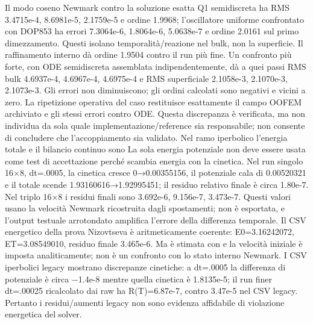 {}Il modo coseno Newmark contro la soluzione esatta Q1 semidiscreta ha RMS 3.4715e-4, 8.6981e-5, 2.1759e-5 e ordine 1.9968; l’oscillatore uniforme confrontato con DOP853 ha errori 7.3064e-6, 1.8064e-6, 5.0638e-7 e ordine 2.0161 sul primo dimezzamento. Questi isolano temporalità/reazione nel bulk, non la superficie.\markdownRendererInterblockSeparator
{} Il raffinamento interno  dà ordine 1.9504 contro il run più fine. Un confronto più forte, con ODE semidiscreta assemblata indipendentemente, dà a quei passi RMS bulk 4.6937e-4, 4.6967e-4, 4.6975e-4 e RMS superficiale 2.1058e-3, 2.1070e-3, 2.1073e-3. Gli errori non diminuiscono; gli ordini calcolati sono negativi e vicini a zero. La ripetizione operativa del caso restituisce esattamente il campo OOFEM archiviato e gli stessi errori contro ODE. Questa discrepanza è verificata, ma non individua da sola quale implementazione/reference sia responsabile; non consente di concludere che l’accoppiamento sia validato.\markdownRendererInterblockSeparator
{}
\markdownRendererSectionEnd \markdownRendererSectionBegin
{}\markdownRendererInterblockSeparator
{}Nel ramo iperbolico l’energia totale e il bilancio continuo sono\markdownRendererInterblockSeparator
{}\markdownRendererInterblockSeparator
{}La sola energia potenziale non deve essere usata come test di accettazione perché scambia energia con la cinetica. Nel run singolo 16×8, dt=.0005, la cinetica cresce 0→0.00355156, il potenziale cala di 0.00520321 e il totale scende 1.93160616→1.92995451; il residuo relativo finale è circa 1.80e-7. Nel triplo 16×8 i residui finali sono 3.692e-6, 9.156e-7, 3.473e-7. Questi valori usano la velocità Newmark ricostruita dagli spostamenti;  non è esportata, e l’output testuale arrotondato amplifica l’errore della differenza temporale.\markdownRendererInterblockSeparator
{}Il CSV energetico della prova Nizovtseva è aritmeticamente coerente: E0=3.16242072, ET=3.08549010, residuo finale 3.465e-6. Ma  è stimata con  e la velocità iniziale è imposta analiticamente; non è un confronto con lo stato interno Newmark. I CSV iperbolici legacy mostrano discrepanze cinetiche: a dt=.0005 la differenza di potenziale è circa −1.4e-8 mentre quella cinetica è 1.8135e-5; il run finer dt=.00025 ricalcolato dai raw ha R(T)=6.87e-7, contro 3.47e-5 nel CSV legacy. Pertanto i residui/aumenti legacy non sono evidenza affidabile di violazione energetica del solver.\markdownRendererInterblockSeparator
